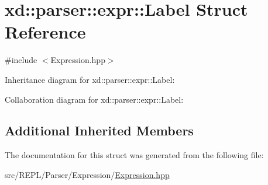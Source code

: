 \hypertarget{structxd_1_1parser_1_1expr_1_1_label}{}\section{xd\+:\+:parser\+:\+:expr\+:\+:Label Struct Reference}
\label{structxd_1_1parser_1_1expr_1_1_label}


{\ttfamily \#include $<$Expression.\+hpp$>$}



Inheritance diagram for xd\+:\+:parser\+:\+:expr\+:\+:Label\+:


Collaboration diagram for xd\+:\+:parser\+:\+:expr\+:\+:Label\+:
\subsection*{Additional Inherited Members}


The documentation for this struct was generated from the following file\+:\begin{DoxyCompactItemize}
\item 
src/\+R\+E\+P\+L/\+Parser/\+Expression/\mbox{\hyperlink{_expression_8hpp}{Expression.\+hpp}}\end{DoxyCompactItemize}
